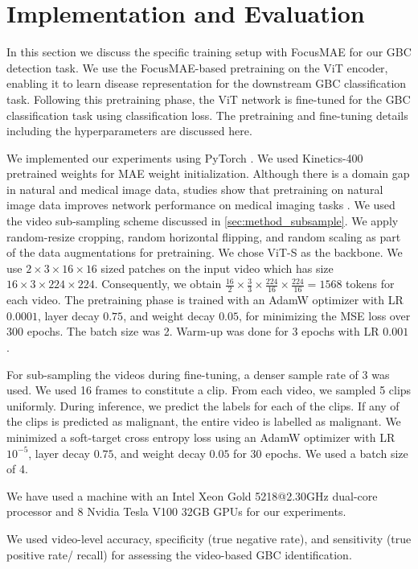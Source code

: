 \section{Implementation and Evaluation}
\label{sec:focusmae_impl}
In this section we discuss the specific training setup with FocusMAE for our GBC detection task. We use the FocusMAE-based pretraining on the ViT encoder, enabling it to learn disease representation for the downstream GBC classification task. Following this pretraining phase, the ViT network is fine-tuned for the GBC classification task using classification loss. The pretraining and fine-tuning details including the hyperparameters are discussed here.

%
We implemented our experiments using PyTorch \cite{paszke2019pytorch}. We used Kinetics-400 pretrained weights for MAE weight initialization. Although there is a domain gap in natural and medical image data, studies show that pretraining on natural image data improves network performance on medical imaging tasks \cite{alzubaidi2020transferlearning, cheng2017transfer}.
We used the video sub-sampling scheme discussed in \cref{sec:method_subsample}. We apply random-resize cropping, random horizontal flipping, and random scaling as part of the data augmentations for pretraining. We chose ViT-S as the backbone. 
We use $2 \times 3 \times 16 \times 16$ sized patches on the input video which has size $16\times3\times224\times224$. Consequently, we obtain $\frac{16}{2} \times \frac{3}{3}\times \frac{224}{16} \times \frac{224}{16} = 1568$ tokens for each video.
The pretraining phase is trained with an AdamW optimizer with LR $0.0001$, layer decay $0.75$, and weight decay $0.05$, for minimizing the MSE loss over 300 epochs. The batch size was 2. Warm-up was done for 3 epochs with LR $0.001$.

%
\label{label:impl_ft}
For sub-sampling the videos during fine-tuning, a denser sample rate of 3 was used. We used 16 frames to constitute a clip. From each video, we sampled 5 clips uniformly. During inference, we predict the labels for each of the clips. If any of the clips is predicted as malignant, the entire video is labelled as malignant. We minimized a soft-target cross entropy loss using an AdamW optimizer with LR $10^{-5}$, layer decay $0.75$, and weight decay $0.05$ for 30 epochs. We used a batch size of 4. 

We have used a machine with an Intel Xeon Gold 5218@2.30GHz dual-core processor and 8 Nvidia Tesla V100 32GB GPUs for our experiments. 

%
We used video-level accuracy, specificity (true negative rate), and sensitivity (true positive rate/ recall) for assessing the video-based GBC identification. %